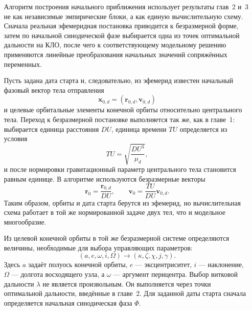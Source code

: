 Алгоритм построения начального приближения использует результаты глав~2 и~3 не как независимые эмпирические блоки, а как единую вычислительную схему. Сначала реальная эфемеридная постановка приводится к безразмерной форме, затем по начальной синодической фазе выбирается одна из точек оптимальной дальности на КЛО, после чего к соответствующему модельному решению применяются линейные преобразования начальных значений сопряжённых переменных.

Пусть задана дата старта и, следовательно, из эфемерид известен начальный фазовый вектор тела отправления
\begin{equation}
	\mathbf x_{0,d}=(\mathbf r_{0,d},\mathbf v_{0,d})
\end{equation}
и целевые орбитальные элементы конечной орбиты относительно центрального тела. Переход к безразмерной постановке выполняется так же, как в главе~1: выбирается единица расстояния \(DU\), единица времени \(TU\) определяется из условия
\begin{equation}
	TU=\sqrt{\frac{DU^3}{\mu_d}},
\end{equation}
и после нормировки гравитационный параметр центрального тела становится равным единице. В алгоритме используются безразмерные векторы
\begin{equation}
	\mathbf r_0=\frac{\mathbf r_{0,d}}{DU},
	\qquad
	\mathbf v_0=\frac{TU}{DU}\mathbf v_{0,d}.
\end{equation}
Таким образом, орбиты и дата старта берутся из эфемерид, но вычислительная схема работает в той же нормированной задаче двух тел, что и модельное многообразие.

Из целевой конечной орбиты в той же безразмерной системе определяются величины, необходимые для выбора управляющих параметров:
\begin{equation}
	\left(a,e,\omega,i,\Omega \right)\longrightarrow \left( \kappa,
	\zeta,\chi,j,\gamma
	\right).
\end{equation}
Здесь \(a\) задаёт полуось конечной орбиты, \(e\) --- эксцентриситет, \(i\) --- наклонение, \(\Omega\) --- долгота восходящего узла, а \(\omega\) --- аргумент перицентра. Выбор витковой дальности \(\lambda\) не является произвольным. Он выполняется через точки оптимальной дальности, введённые в главе~2. Для заданной даты старта сначала определяется начальная синодическая фаза \(\Phi\).


